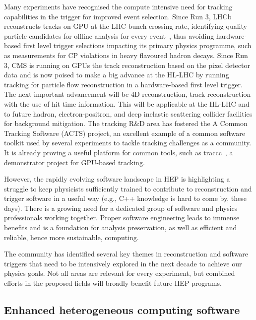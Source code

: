 \documentclass[10pt,a4paper]{article}
\begin{document}
Many experiments have recognised the compute intensive need for tracking
capabilities in the trigger for improved event selection. Since Run 3, LHCb
reconstructs tracks on GPU at the LHC bunch crossing rate, identifying quality
particle candidates for offline analysis for every event~\cite{LHCb:HLT}, thus
avoiding hardware-based first level trigger selections impacting its primary
physics programme, such as measurements for CP violations in heavy flavoured
hadron decays. Since Run 3, CMS is running on GPUs the track reconstruction
based on the pixel detector data and is now poised to make a big advance at the
HL-LHC by running tracking for particle flow reconstruction in a hardware-based
first level trigger. The next important advancement will be 4D reconstruction,
track reconstruction with the use of hit time information. This will be
applicable at the HL-LHC and to future hadron, electron-positron, and deep
inelastic scattering collider facilities for background mitigation. The tracking
R\&D area has fostered the A Common Tracking Software (ACTS) project\cite{Ai2022Common},
an excellent example of a common software toolkit used by several experiments to
tackle tracking challenges as a community. It is already proving a useful
platform for common tools, such as traccc~\cite{yeo_2023_8119769, traccc}, a
demonstrator project for GPU-based tracking.

However, the rapidly evolving software landscape in HEP is highlighting a
struggle to keep physicists sufficiently trained to contribute to reconstruction
and trigger software in a useful way (e.g., C++ knowledge is hard to come by,
these days). There is a growing need for a dedicated group of software and
physics professionals working together. Proper software engineering leads to
immense benefits and is a foundation for analysis preservation, as well as
efficient and reliable, hence more sustainable, computing.

The community has identified several key themes in reconstruction and software
triggers that need to be intensively explored in the next decade to achieve our
physics goals. Not all areas are relevant for every experiment, but combined
efforts in the proposed fields will broadly benefit future HEP programs.

\subsection{Enhanced heterogeneous computing
software}\label{enhanced-heterogeneous-computing-software}
\end{document}
